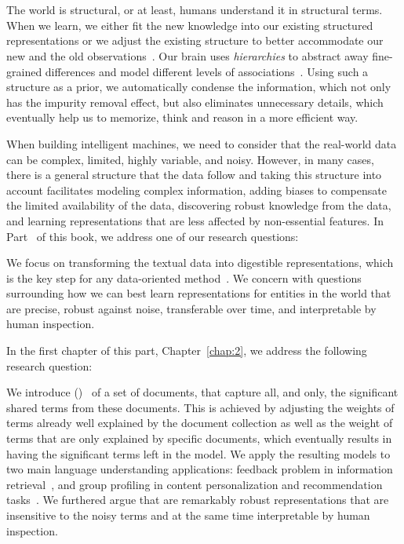 \part{}
\label{part1}
%
The world is structural, or at least, humans understand it in structural terms. When we learn, we either fit the new knowledge into our existing structured representations or we adjust the existing structure to better accommodate our new and the old observations~\citep{battaglia2018relational}.
%
Our brain uses \emph{hierarchies} to abstract away fine-grained differences and model different levels of associations~\citep{Ballard:2015}. Using such a structure as a prior, we automatically condense the information, which not only has the impurity removal effect, but also eliminates unnecessary details, which eventually help us to memorize, think and reason in a more efficient way.

When building intelligent machines, we need to consider that the real-world data can be complex, limited, highly variable, and noisy. However, in many cases, there is a general structure that the data follow and taking this structure into account facilitates modeling complex information, adding biases to compensate the limited availability of the data, discovering robust knowledge from the data, and learning representations that are less affected by non-essential features. 
%
In Part~\ref{part1} of this book, we address one of our research questions:

We focus on transforming the textual data into digestible representations, which is the key step for any data-oriented method~\citep{Bengio:2013}. We concern with questions surrounding how we can best learn representations for entities in the world that are precise, robust against noise, transferable over time, and interpretable by human inspection.  

In the first chapter of this part, Chapter~\ref{chap:2}, we address the following research question:

We introduce \emph{\swlms} (\acswlm)~\citep{Dehghani:2016:SIGIR} of a set of documents, that capture all, and only, the significant shared terms from these documents.  This is achieved by adjusting the weights of terms already well explained by the document collection as well as the weight of terms that are only explained by specific documents, which eventually results in having the significant terms left in the model. 
We apply the resulting models to two main language understanding applications: feedback problem in information retrieval~\citep{Dehghani:CIKM2016:long, Dehghani:CIKM2016:short}, and group profiling in content personalization and recommendation tasks~\citep{Dehghani:2016:CHIIR,Dehghani2016:trec}. We furthered argue that \acswlm are remarkably robust representations that are insensitive to the noisy terms and at the same time interpretable by human inspection. 

